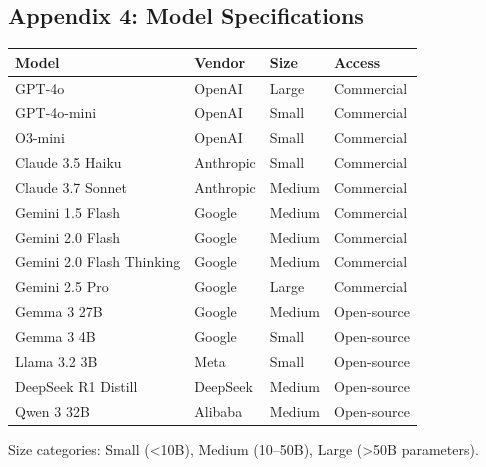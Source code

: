 \documentclass[12pt]{article}
\begin{document}

\subsection*{Appendix 4: Model Specifications}

\begin{center}
\begin{tabular}{llll}
\toprule
\textbf{Model} & \textbf{Vendor} & \textbf{Size} & \textbf{Access} \\
\midrule
GPT-4o & OpenAI & Large & Commercial \\
GPT-4o-mini & OpenAI & Small & Commercial \\
O3-mini & OpenAI & Small & Commercial \\
Claude 3.5 Haiku & Anthropic & Small & Commercial \\
Claude 3.7 Sonnet & Anthropic & Medium & Commercial \\
Gemini 1.5 Flash & Google & Medium & Commercial \\
Gemini 2.0 Flash & Google & Medium & Commercial \\
Gemini 2.0 Flash Thinking & Google & Medium & Commercial \\
Gemini 2.5 Pro & Google & Large & Commercial \\
Gemma 3 27B & Google & Medium & Open-source \\
Gemma 3 4B & Google & Small & Open-source \\
Llama 3.2 3B & Meta & Small & Open-source \\
DeepSeek R1 Distill & DeepSeek & Medium & Open-source \\
Qwen 3 32B & Alibaba & Medium & Open-source \\
\bottomrule
\end{tabular}
\end{center}

Size categories: Small (<10B), Medium (10--50B), Large (>50B parameters).
\end{document}
